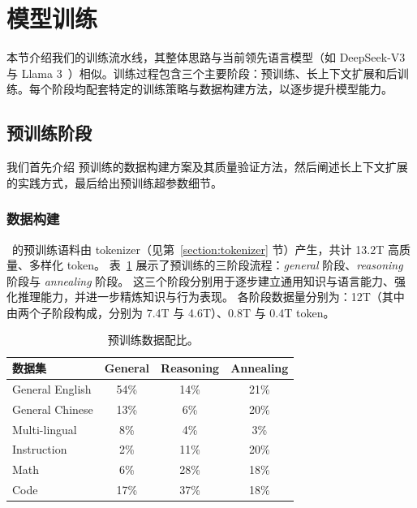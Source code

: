 \section{模型训练}
本节介绍我们的训练流水线，其整体思路与当前领先语言模型（如 DeepSeek-V3~\cite{deepseekv3} 与 Llama 3~\cite{dubey2024llama}）相似。训练过程包含三个主要阶段：预训练、长上下文扩展和后训练。每个阶段均配套特定的训练策略与数据构建方法，以逐步提升模型能力。


\subsection{预训练阶段}


我们首先介绍 \modelname 预训练的数据构建方案及其质量验证方法，然后阐述长上下文扩展的实践方式，最后给出预训练超参数细节。

\subsubsection{数据构建}
\modelname~的预训练语料由 tokenizer（见第~\ref{section:tokenizer} 节）产生，共计 13.2T 高质量、多样化 token。
表~\ref{tab:data_recipe} 展示了预训练的三阶段流程：\textit{general} 阶段、\textit{reasoning} 阶段与 \textit{annealing} 阶段。
这三个阶段分别用于逐步建立通用知识与语言能力、强化推理能力，并进一步精炼知识与行为表现。
各阶段数据量分别为：12T（其中由两个子阶段构成，分别为 7.4T 与 4.6T）、0.8T 与 0.4T token。




\begin{table}[h!]
    \centering
        \caption{\modelname~预训练数据配比。}
        \small
        \begin{tabular}{l|c|c|c} 
        \toprule
        \textbf{数据集} & \textbf{General} & \textbf{Reasoning} & \textbf{Annealing} \\ 
        \midrule
        General English & 54\% & 14\% & 21\% \\ 
        General Chinese & 13\% & 6\% & 20\% \\ 
        Multi-lingual & 8\% & 4\% & 3\% \\ 
        Instruction & 2\% & 11\% & 20\% \\ 
        Math & 6\% & 28\% & 18\% \\ 
        Code & 17\% & 37\% & 18\% \\ 
        \bottomrule
        \end{tabular}
    \label{tab:data_recipe}
\end{table}


